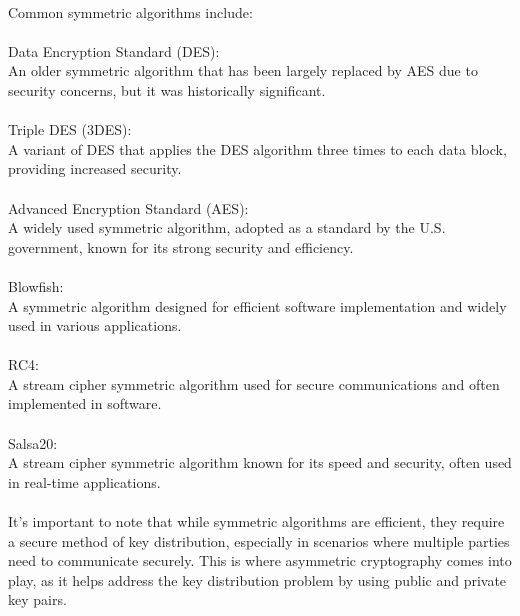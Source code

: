 \documentclass{report}
\begin{document}
\\
Common symmetric algorithms include:\\
\\
Data Encryption Standard (DES):\\
 An older symmetric algorithm that has been largely replaced by AES due to security concerns, but it was historically significant.\\
\\
Triple DES (3DES):\\
 A variant of DES that applies the DES algorithm three times to each data block, providing increased security.\\
\\
Advanced Encryption Standard (AES):\\
 A widely used symmetric algorithm, adopted as a standard by the U.S. government, known for its strong security and efficiency.\\
\\
Blowfish:\\
 A symmetric algorithm designed for efficient software implementation and widely used in various applications.\\
\\
RC4:\\
 A stream cipher symmetric algorithm used for secure communications and often implemented in software.\\
\\
Salsa20:\\
 A stream cipher symmetric algorithm known for its speed and security, often used in real-time applications.\\
\\
It's important to note that while symmetric algorithms are efficient, they require a secure method of key distribution, especially in scenarios where multiple parties need to communicate securely. This is where asymmetric cryptography comes into play, as it helps address the key distribution problem by using public and private key pairs.
\end{document}
